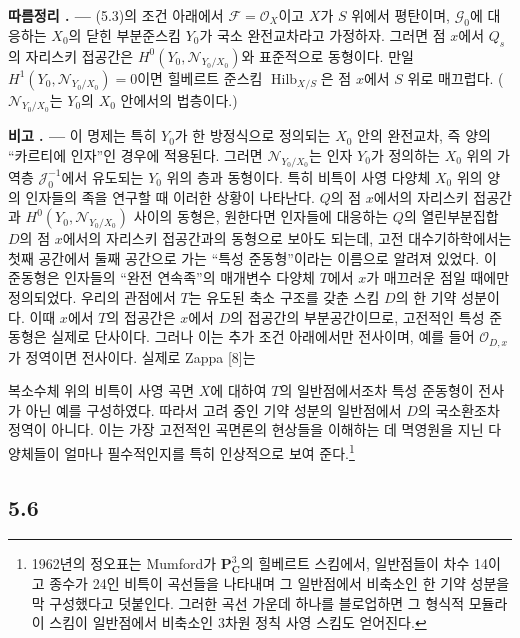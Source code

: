 \documentclass[11pt,twoside,openany]{book}
\numberwithin{equation}{section}
\newcommand{\sourceunit}{front}
\newcommand{\src}[1]{%
  \phantomsection\hypertarget{src:\sourceunit:#1}{}%
  \marginpar{\raggedleft\footnotesize\sffamily #1}%
}
\theoremstyle{plain}
\theoremstyle{definition}
\theoremstyle{remark}
\newcommand{\result}[2]{%
  \par\medskip\noindent\textbf{#1%
  \if\relax\detokenize{#2}\relax\else\space#2\fi. ---}\enspace
}
\begin{document}
\result{따름정리}{5.4} (5.3)의 조건 아래에서
$\mathcal F=\mathcal O_X$이고 $X$가 $S$ 위에서 평탄이며,
$\mathcal G_0$에 대응하는 $X_0$의 닫힌 부분준스킴 $Y_0$가 국소
완전교차라고 가정하자. 그러면 점 $x$에서 $Q_s$의 자리스키 접공간은
$H^0(Y_0,\mathcal N_{Y_0/X_0})$와 표준적으로 동형이다. 만일
$H^1(Y_0,\mathcal N_{Y_0/X_0})=0$이면 힐베르트 준스킴
$\operatorname{Hilb}_{X/S}$은 점 $x$에서 $S$ 위로 매끄럽다.
($\mathcal N_{Y_0/X_0}$는 $Y_0$의 $X_0$ 안에서의 법층이다.)

\result{비고}{5.5} 이 명제는 특히 $Y_0$가 한 방정식으로 정의되는
$X_0$ 안의 완전교차, 즉 양의 ``카르티에 인자''인 경우에 적용된다.
그러면 $\mathcal N_{Y_0/X_0}$는 인자 $Y_0$가 정의하는 $X_0$ 위의
가역층 $\mathcal J_0^{-1}$에서 유도되는 $Y_0$ 위의 층과 동형이다. 특히
비특이 사영 다양체 $X_0$ 위의 양의 인자들의 족을 연구할 때 이러한
상황이 나타난다. $Q$의 점 $x$에서의 자리스키 접공간과
$H^0(Y_0,\mathcal N_{Y_0/X_0})$ 사이의 동형은, 원한다면 인자들에
대응하는 $Q$의 열린부분집합 $D$의 점 $x$에서의 자리스키 접공간과의
동형으로 보아도 되는데, 고전 대수기하학에서는 첫째 공간에서 둘째
공간으로 가는 ``특성 준동형''이라는 이름으로 알려져 있었다. 이
준동형은 인자들의 ``완전 연속족''의 매개변수 다양체 $T$에서 $x$가
매끄러운 점일 때에만 정의되었다. 우리의 관점에서 $T$는 유도된 축소
구조를 갖춘 스킴 $D$의 한 기약 성분이다. 이때 $x$에서 $T$의 접공간은
$x$에서 $D$의 접공간의 부분공간이므로, 고전적인 특성 준동형은 실제로
단사이다. 그러나 이는 추가 조건 아래에서만 전사이며, 예를 들어
$\mathcal O_{D,x}$가 정역이면 전사이다. 실제로 Zappa [8]는
\src{272}
복소수체 위의 비특이 사영 곡면 $X$에 대하여 $T$의 일반점에서조차
특성 준동형이 전사가 아닌 예를 구성하였다. 따라서 고려 중인 기약
성분의 일반점에서 $D$의 국소환조차 정역이 아니다. 이는 가장 고전적인
곡면론의 현상들을 이해하는 데 멱영원을 지닌 다양체들이 얼마나
필수적인지를 특히 인상적으로 보여 준다.\footnote{1962년의 정오표는
Mumford가 $\mathbf P^3_{\mathbf C}$의 힐베르트 스킴에서, 일반점들이 차수
14이고 종수가 24인 비특이 곡선들을 나타내며 그 일반점에서 비축소인 한
기약 성분을 막 구성했다고 덧붙인다. 그러한 곡선 가운데 하나를
블로업하면 그 형식적 모듈라이 스킴이 일반점에서 비축소인 3차원 정칙
사영 스킴도 얻어진다.}

\subsection*{5.6}
\end{document}
